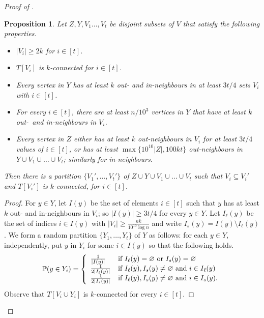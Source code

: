 \documentclass[english]{article}
\theoremstyle{plain}
\newtheorem{proposition}[theorem]{Proposition}
\theoremstyle{remark}
\renewcommand{\Pr}{\mathbb{P}}
\let\emptyset\varnothing
\let\originalleft\left
\let\originalright\right
\renewcommand{\left}{\mathopen{}\mathclose\bgroup\originalleft}
\renewcommand{\right}{\aftergroup\egroup\originalright}
\begin{document}
\begin{proof}[Proof of ]
		\begin{proposition} \label{prop:extending-partition}
			Let $Z, Y, V_1 \ldots, V_{t}$ be disjoint subsets of $V$ that satisfy the following properties.
			\begin{itemize}
				\item
					$|V_i| \ge 2k$ for $i \in [t]$.
				\item
					$T[V_i]$ is $k$-connected for $i \in [t]$.
				\item
					Every vertex in $Y$ has at least $k$ out- and in-neighbours in at least $3t/4$ sets $V_i$ with $i \in [t]$.
				\item
					For every $i \in [t]$, there are at least $n/10^3$ vertices in $Y$ that have at least $k$ out-\ and in-neighbours in $V_i$.
				\item
					Every vertex in $Z$ either has at least $k$ out-neighbours in $V_i$ for at least $3t/4$ values of $i \in [t]$, or has at least  $\max\{10^{10}|Z|, 100kt\}$ out-neighbours in $Y \cup V_1 \cup \ldots \cup V_{t}$; similarly for in-neighbours.
			\end{itemize}

			Then there is a partition $\{V_1', \ldots, V_{t}'\}$ of $Z \cup Y \cup V_1 \cup \ldots \cup V_{t}$ such that $V_i \subseteq V_i'$ and $T[V_i']$ is $k$-connected, for $i \in [t]$. 
		\end{proposition}
		
		\begin{proof}
			For $y \in Y$, let $I(y)$ be the set of elements $i \in [t]$ such that $y$ has at least $k$ out- and in-neighbours in $V_i$; so $|I(y)| \ge 3t/4$ for every $y \in Y$. Let $I_{\ell}(y)$ be the set of indices $i \in I(y)$ with $|V_i| \ge \frac{nk}{10^{10}\log n}$ and write $I_s(y) = I(y) \setminus I_{\ell}(y)$.
			We form a random partition $\{Y_1, \ldots, Y_{t}\}$ of $Y$ as follows: for each $y \in Y$, independently, put $y$ in $Y_i$ for some $i \in I(y)$ so that the following holds.
			\begin{equation*}
				\Pr\left(y \in Y_i\right) = \left\{
					\begin{array}{ll}
						\frac{1}{|I(y)|} & \text{if } I_{\ell}(y) = \emptyset \text{ or } I_s(y) = \emptyset  \\
						\frac{1}{2|I_{\ell}(y)|} & \text{if } I_{\ell}(y), I_s(y) \neq \emptyset \text{ and } i \in I_{\ell}(y) \\
						\frac{1}{2|I_{s}(y)|} & \text{if } I_{\ell}(y), I_s(y) \neq \emptyset \text{ and } i \in I_{s}(y).
					\end{array}
				\right.
			\end{equation*}
			Observe that $T[V_i \cup Y_i]$ is $k$-connected for every $i \in [t]$.


\end{proof}
\end{proof}
\end{document}
